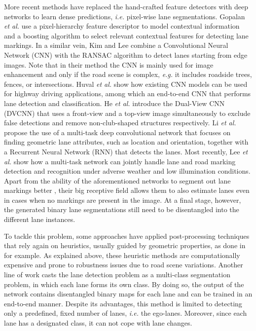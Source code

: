 \documentclass[letterpaper, 10 pt, conference]{ieeeconf}
\newcommand{\eg}{\textit{e.g. }}
\newcommand{\etal}{\textit{et al. }}
\newcommand{\ie}{\textit{i.e. }}
\begin{document}
More recent methods have replaced the hand-crafted feature detectors with deep networks
to learn dense predictions, \ie pixel-wise lane segmentations. 
Gopalan \etal \cite{Gopalan12} use a pixel-hierarchy feature descriptor to model contextual information and a boosting algorithm to select relevant contextual features for detecting lane markings.
In a similar vein, Kim and Lee \cite{Kim14} combine a Convolutional Neural Network (CNN) with the RANSAC algorithm to detect lanes starting from edge images.
Note that in their method the CNN is mainly used for image enhancement and only if the road scene is complex, \eg it includes roadside trees, fences, or intersections.
Huval \etal \cite{Huval15} show how existing CNN models can be used for highway driving applications, among which an end-to-end CNN that performs lane detection and classification.
He \etal \cite{He16} introduce the Dual-View CNN (DVCNN) that uses a front-view and a top-view image simultaneously to exclude false detections and remove non-club-shaped structures respectively.
Li \etal \cite{Li17} propose the use of a multi-task deep convolutional network that focuses on finding geometric lane attributes, such as location and orientation, together with a Recurrent Neural Network (RNN) that detects the lanes.
Most recently, Lee \etal \cite{Lee17} show how a multi-task network can jointly handle lane and road marking detection and recognition under adverse weather and low illumination conditions.
Apart from the ability of the aforementioned networks to segment out lane markings better \cite{Huval15}, their big receptive field allows them to also estimate lanes even in cases when no markings are present in the image. 
At a final stage, however, the generated binary lane segmentations still need to be disentangled into the different lane instances. 

To tackle this problem, some approaches have applied post-processing techniques that rely again on heuristics, usually guided by geometric properties, as done in \cite{Kim14,Gurghian16} for example.
As explained above, these heuristic methods are computationally expensive and prone to robustness issues due to road scene variations. 
Another line of work \cite{Kim17} casts the lane detection problem as a multi-class segmentation problem, in which each lane forms its own class. 
By doing so, the output of the network contains disentangled binary maps for each lane and can be trained in an end-to-end manner. 
Despite its advantages, this method is limited to detecting only a predefined, fixed number of lanes, \ie the ego-lanes. 
Moreover, since each lane has a designated class, it can not cope with lane changes.
\end{document}

